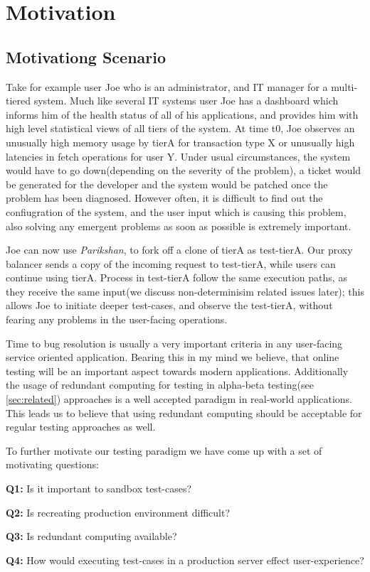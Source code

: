 
\section{Motivation}

\subsection{Motivationg Scenario}

Take for example user Joe who is an administrator, and IT manager for a multi-tiered system. 
Much like several IT systems user Joe has a dashboard which informs him of the health status of all of his applications, and provides him with high level statistical views of all tiers of the system.
At time t0, Joe observes an unusually high memory usage by tierA for transaction type X or unusually high latencies in fetch operations for user Y.
Under usual circumstances, the system would have to go down(depending on the severity of the problem), a ticket would be generated for the developer and the system would be patched once the problem has been diagnosed.
However often, it is difficult to find out the confiugration of the system, and the user input which is causing this problem, also solving any emergent problems as soon as possible is extremely important.

Joe can now use \textit{Parikshan}, to fork off a clone of tierA as test-tierA. Our proxy balancer sends a copy of the incoming request to test-tierA, while users can continue using tierA. 
Process in test-tierA follow the same execution paths, as they receive the same input(we discuss non-determinisim related issues later); this allows Joe to initiate deeper test-cases, and observe the test-tierA, without fearing any problems in the user-facing operations.

Time to bug resolution is usually a very important criteria in any user-facing service oriented application.
Bearing this in my mind we believe, that online testing will be an important aspect towards modern applications.
Additionally the usage of redundant computing for testing in alpha-beta testing(see \ref{sec:related}) approaches is a well accepted paradigm in real-world applications.
This leads us to believe that using redundant computing should be acceptable for regular testing approaches as well.

To further motivate our testing paradigm we have come up with a set of motivating questions:

\begin{compactitem}
\setlength{\itemsep}{1Pt}
\item[]\textbf{Q1:} Is it important to sandbox test-cases?
\item[]\textbf{Q2:} Is recreating production environment difficult? 
\item[]\textbf{Q3:} Is redundant computing available? 
\item[]\textbf{Q4:} How would executing test-cases in a production server effect user-experience?
\end{compactitem}

